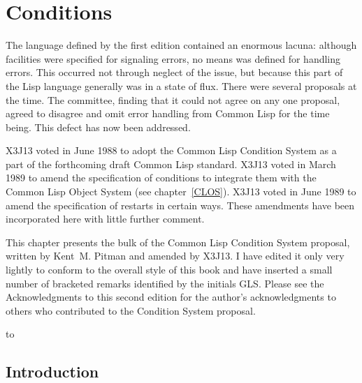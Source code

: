 
\clearpage\def\pagestatus{FINAL PROOF}


\def\SU#1{${}_{#1}$}

\chapter{Conditions}
\label{CONDITION}

\prefaceword
\begin{new}
The language defined by the first edition contained an enormous lacuna:
although facilities were specified for signaling errors,
no means was defined for handling errors.  This occurred not through neglect
of the issue, but because this part of the Lisp language generally
was in a state of flux.  There were several proposals at the
time.  The committee, finding that it could not agree on any one proposal,
agreed to disagree and omit error handling from Common Lisp for the time being.
This defect has now been addressed.
\end{new}

X3J13 voted in June 1988
to adopt the Common Lisp Condition System
as a part of the forthcoming draft Common Lisp standard.
X3J13 voted in March 1989 
to amend the specification of conditions to integrate them
with the Common Lisp Object System (see chapter~\ref{CLOS}). 
X3J13 voted in June 1989  to amend the
specification of restarts in certain ways. These amendments have
been incorporated here with little further comment.

This chapter presents the bulk of the Common Lisp
Condition System proposal, written by Kent~M. Pitman
and amended by X3J13.  I have edited it only very lightly
to conform to the overall style of this book and have inserted a small
number of bracketed remarks identified by the initials GLS.
Please see the Acknowledgments to this second edition for the author's
acknowledgments to others who contributed to the Condition System proposal.

\noindent\hbox to \textwidth{\hss---Guy L. Steele Jr.}



\section{Introduction}

